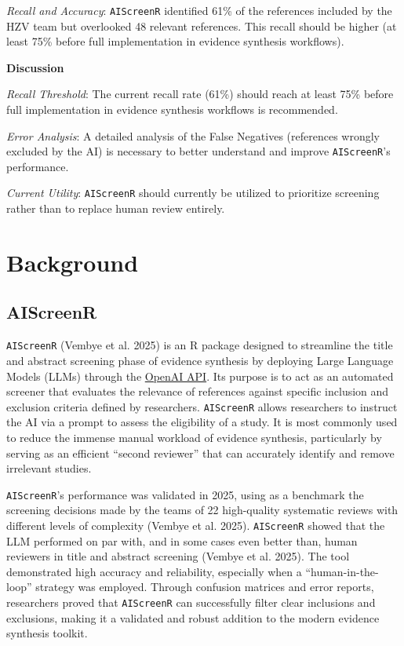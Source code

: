 \documentclass[
  letterpaper,
  DIV=11,
  numbers=noendperiod]{scrartcl}
\begin{document}
\emph{Recall and Accuracy}: \texttt{AIScreenR} identified 61\% of the
references included by the HZV team but overlooked 48 relevant
references. This recall should be higher (at least 75\% before full
implementation in evidence synthesis workflows).

\textbf{Discussion}

\emph{Recall Threshold}: The current recall rate (61\%) should reach at
least 75\% before full implementation in evidence synthesis workflows is
recommended.

\emph{Error Analysis}: A detailed analysis of the False Negatives
(references wrongly excluded by the AI) is necessary to better
understand and improve \texttt{AIScreenR}'s performance.

\emph{Current Utility}: \texttt{AIScreenR} should currently be utilized
to prioritize screening rather than to replace human review entirely.

\section{Background}\label{background}

\subsection{AIScreenR}\label{aiscreenr}

\texttt{AIScreenR} (Vembye et al. 2025) is an R package designed to
streamline the title and abstract screening phase of evidence synthesis
by deploying Large Language Models (LLMs) through the
\href{https://openai.com/nb-NO/api/}{OpenAI API}. Its purpose is to act
as an automated screener that evaluates the relevance of references
against specific inclusion and exclusion criteria defined by
researchers. \texttt{AIScreenR} allows researchers to instruct the AI
via a prompt to assess the eligibility of a study. It is most commonly
used to reduce the immense manual workload of evidence synthesis,
particularly by serving as an efficient ``second reviewer'' that can
accurately identify and remove irrelevant studies.

\texttt{AIScreenR}'s performance was validated in 2025, using as a
benchmark the screening decisions made by the teams of 22 high-quality
systematic reviews with different levels of complexity (Vembye et al.
2025). \texttt{AIScreenR} showed that the LLM performed on par with, and
in some cases even better than, human reviewers in title and abstract
screening (Vembye et al. 2025). The tool demonstrated high accuracy and
reliability, especially when a ``human-in-the-loop'' strategy was
employed. Through confusion matrices and error reports, researchers
proved that \texttt{AIScreenR} can successfully filter clear inclusions
and exclusions, making it a validated and robust addition to the modern
evidence synthesis toolkit.
\end{document}
